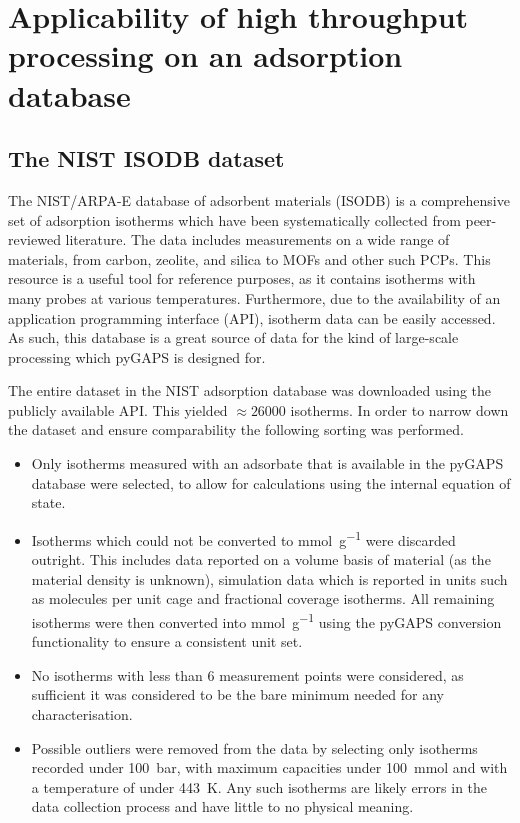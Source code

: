 
\section{Applicability of high throughput processing on an adsorption database}

\subsection{The NIST ISODB dataset}

The NIST/ARPA-E database of adsorbent materials (ISODB) is a comprehensive
set of adsorption isotherms which have been systematically
collected from peer-reviewed literature. The data includes 
measurements on a wide range of materials, from carbon, zeolite,
and silica to MOFs and other such PCPs. This resource is a useful
tool for reference purposes, as it contains isotherms with many probes
at various temperatures. Furthermore, due to the availability of an 
application programming interface (API), isotherm data can be easily
accessed. As such, this database is a great 
source of data for the kind of large-scale processing which pyGAPS
is designed for.

The entire dataset in the NIST adsorption database was downloaded using the
publicly available API. This yielded \(\approx \! 26000\) isotherms.
In order to narrow down the dataset and ensure comparability
the following sorting was performed.

\begin{itemize}
    \item Only isotherms measured with an adsorbate that is available
    in the pyGAPS database were selected, to allow for calculations
    using the internal equation of state.
    \item Isotherms which could not be converted to \si{\milli\mol\per\gram}
    were discarded outright. This includes data reported 
    on a volume basis of material (as the material density is 
    unknown), simulation data which is reported in units such 
    as molecules per unit cage and fractional coverage isotherms.
    All remaining isotherms were then converted into 
    \si{\milli\mol\per\gram} using the pyGAPS conversion 
    functionality to ensure a consistent unit set.
    \item No isotherms with less than 6 measurement points were 
    considered, as sufficient it was considered to be the bare 
    minimum needed for any characterisation.
    \item Possible outliers were removed from the data by selecting 
    only isotherms recorded under \SI{100}{\bar}, with maximum capacities
    under \SI{100}{\milli\mol} and with a temperature of under 
    \SI{443}{\kelvin}. Any such isotherms are likely errors in the 
    data collection process and have little to no physical meaning.
\end{itemize}

